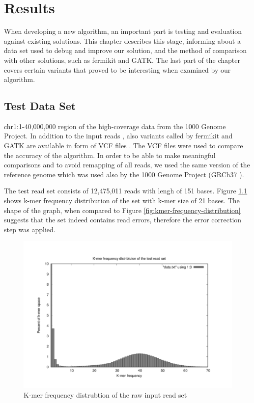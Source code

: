 \chapter{Results}
\label{chap:results}

When developing a new algorithm, an important part is testing and evaluation
against existing solutions. This chapter describes this stage, informing about a data set used to debug and improve our solution, and the method of comparison with other solutions, such as fermikit and GATK. The last part of the chapter covers certain variants that proved to be interesting when examined by our algorithm.

\section{Test Data Set}
\label{sec:test-data-set}

 chr1:1-40,000,000 region of the high-coverage
data from the 1000 Genome Project. In addition to the input reads \cite{testreads}, also variants called by fermikit and GATK are available in form of VCF files \cite{testvcf}. The VCF files were used to compare the accuracy of the algorithm. In order to be able to make meaningful comparisons and to avoid remapping of all reads, we used the same version of the reference genome which was used also by the 1000 Genome Project (GRCh37 \cite{testref}).

The test read set consists of 12,475,011 reads with lengh of 151 bases. Figure \ref{fig:test-kmer-frequency-distribution} shows k-mer frequency distribution of the set with k-mer size of 21 bases. The shape of the graph, when compared to Figure \ref{fig:kmer-frequency-distribution} suggests that the set indeed contains read errors, therefore the error correction step was applied.

\begin{figure}[h]
\centering
\includegraphics{img/test-kmer-frequency-distribution.pdf}
\caption{K-mer frequency distrubtion of the raw input read set}
\label{fig:test-kmer-frequency-distribution}
\end{figure}

